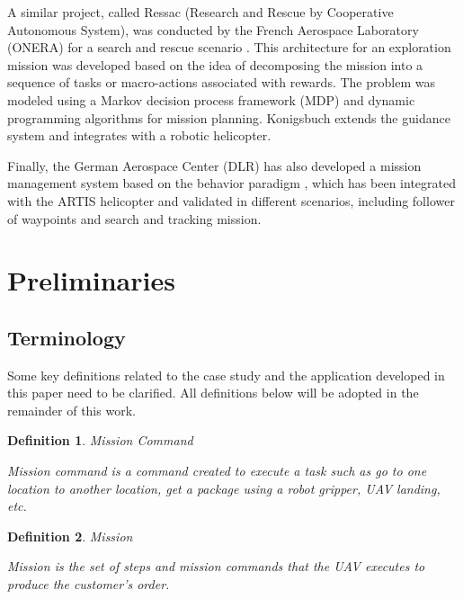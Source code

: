 \documentclass[conference,harvard,brazil,english]{sbatex}
\newtheorem{myDefinition}{Definition}
\begin{document}
A similar project, called Ressac (Research and Rescue by Cooperative Autonomous System), was conducted by the French Aerospace Laboratory (ONERA) for a search and rescue scenario \cite{fabiani2007autonomous}. This architecture for an exploration mission was developed based on the idea of decomposing the mission into a sequence of tasks or macro-actions associated with rewards. The problem was modeled using a Markov decision process framework (MDP) and dynamic programming algorithms for mission planning. Konigsbuch \cite{teichteil2007multi} extends the guidance system and integrates with a robotic helicopter.

Finally, the German Aerospace Center (DLR) has also developed a mission management system based on the behavior paradigm \cite{adolf2010onboard}, which has been integrated with the ARTIS helicopter and validated in different scenarios, including follower of waypoints and search and tracking mission.

\section{Preliminaries}
\label{sec:background}

\subsection{Terminology}
\label{sec:terms}

Some key definitions related to the case study and the application developed in this paper need to be clarified. All definitions below will be adopted in the remainder of this work.

\begin{myDefinition}{Mission Command}

Mission command is a command created to execute a task such as go to one location to another location, get a package using a robot gripper, UAV landing, etc.


\label{def:missioncommand}
\end{myDefinition}

\begin{myDefinition}{Mission}

Mission is the set of steps and mission commands that the UAV executes to produce the customer's order.
\label{def:mission}
\end{myDefinition}
\end{document}
